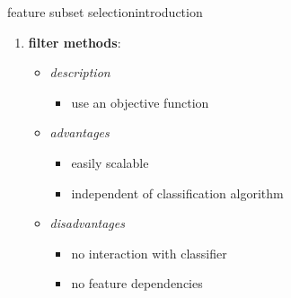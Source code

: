 \begin{frame}{feature subset selection}{introduction}
\begin{enumerate}
				\smallskip
                \item<2->	\textbf{filter methods}:
                    \begin{itemize}
                        \item \textit{description}
                            \begin{itemize}
                                \item  use an objective function
                            \end{itemize}
                         \item<2-> \textit{advantages}
                            \begin{itemize}
                                \item   easily scalable
                                \item   independent of classification algorithm
                            \end{itemize}
                         \item<2-> \textit{disadvantages}
                            \begin{itemize}
                                \item   no interaction with classifier
                                \item   no feature dependencies
                            \end{itemize}
                    \end{itemize}
			\end{enumerate}
		\end{frame}

        
